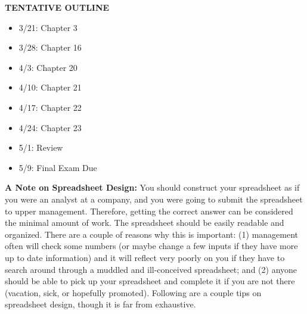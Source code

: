 \documentclass[11pt]{article}
\begin{document}
\pagebreak
\begin{center}
\textbf{TENTATIVE OUTLINE}
\end{center}
\begin{itemize}
\item 3/21:  Chapter 3
\item 3/28:  Chapter 16
\item 4/3:  Chapter 20
\item 4/10: Chapter 21
\item 4/17:  Chapter 22
\item 4/24:  Chapter 23
\item 5/1:  Review
\item 5/9:  Final Exam Due
\end{itemize}
\pagebreak
\textbf{A Note on Spreadsheet Design:}  You should construct your spreadsheet as if you were an analyst at a company, and you were going to submit the spreadsheet to upper management.  Therefore, getting the correct answer can be considered the minimal amount of work.  The spreadsheet should be easily readable and organized.  There are a couple of reasons why this is important: (1) management often will check some numbers (or maybe change a few inputs if they have more up to date information) and it will reflect very poorly on you if they have to search around through a muddled and ill-conceived spreadsheet; and (2) anyone should be able to pick up your spreadsheet and complete it if you are not there (vacation, sick, or hopefully promoted).  Following are a couple tips on spreadsheet design, though it is far from exhaustive.\\
\end{document}
